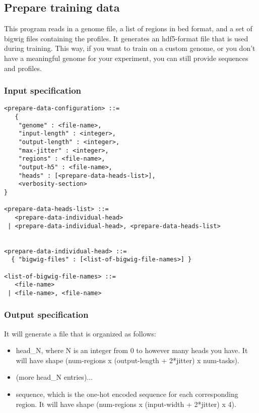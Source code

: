 \documentclass{article}
\begin{document}
\subsection{Prepare training data}

This program reads in a genome file, a list of regions in bed format, and a set of bigwig files containing the profiles. 
It generates an hdf5-format file that is used during training. 
This way, if you want to train on a custom genome, or you don't have a meaningful genome for your experiment, you can still provide sequences and profiles. 

\subsubsection{Input specification}

\begin{lstlisting}
<prepare-data-configuration> ::=
   {
    "genome" : <file-name>,
    "input-length" : <integer>,
    "output-length" : <integer>,
    "max-jitter" : <integer>,
    "regions" : <file-name>,
    "output-h5" : <file-name>,
    "heads" : [<prepare-data-heads-list>],
    <verbosity-section>
}

<prepare-data-heads-list> ::=
   <prepare-data-individual-head>
 | <prepare-data-individual-head>, <prepare-data-heads-list>


<prepare-data-individual-head> ::=
  { "bigwig-files" : [<list-of-bigwig-file-names>] }

<list-of-bigwig-file-names> ::= 
   <file-name>
 | <file-name>, <file-name>

\end{lstlisting}


\subsubsection{Output specification}

It will generate a file that is organized as follows:

\begin{itemize}
    \item head\_N, where N is an integer from 0 to however many heads you have. It will have shape (num-regions x (output-length + 2*jitter) x num-tasks). 
    \item (more head\_N entries)...
    \item sequence, which is the one-hot encoded sequence for each corresponding region. It will have shape (num-regions x (input-width + 2*jitter) x 4). 
\end{itemize}
\end{document}
